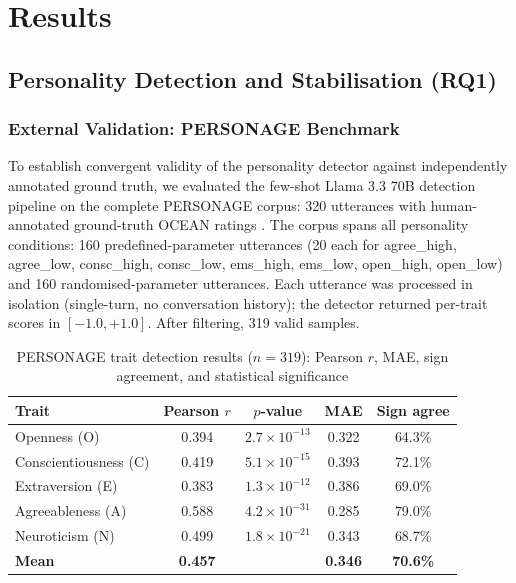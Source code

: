 \documentclass[10pt,a4paper]{report}
\begin{document}
\chapter{Results}
\label{ch:results}

\section{Personality Detection and Stabilisation (RQ1)}

\subsection{External Validation: PERSONAGE Benchmark}

To establish convergent validity of the personality detector against independently annotated ground truth, we evaluated the few-shot Llama 3.3 70B detection pipeline on the complete PERSONAGE corpus: 320 utterances with human-annotated ground-truth OCEAN ratings \citep{Mairesse2011}. The corpus spans all personality conditions: 160 predefined-parameter utterances (20 each for agree\_high, agree\_low, consc\_high, consc\_low, ems\_high, ems\_low, open\_high, open\_low) and 160 randomised-parameter utterances. Each utterance was processed in isolation (single-turn, no conversation history); the detector returned per-trait scores in $[-1.0, +1.0]$. After filtering, 319 valid samples.

\begin{table}[H]
\centering\small
\caption{PERSONAGE trait detection results ($n = 319$): Pearson $r$, MAE, sign agreement, and statistical significance}
\begin{tabular}{@{}lcccc@{}}
\toprule
Trait & Pearson $r$ & $p$-value & MAE & Sign agree \\
\midrule
Openness (O) & 0.394 & $2.7 \times 10^{-13}$ & 0.322 & 64.3\% \\
Conscientiousness (C) & 0.419 & $5.1 \times 10^{-15}$ & 0.393 & 72.1\% \\
Extraversion (E) & 0.383 & $1.3 \times 10^{-12}$ & 0.386 & 69.0\% \\
Agreeableness (A) & 0.588 & $4.2 \times 10^{-31}$ & 0.285 & 79.0\% \\
Neuroticism (N) & 0.499 & $1.8 \times 10^{-21}$ & 0.343 & 68.7\% \\
\textbf{Mean} & \textbf{0.457} & & \textbf{0.346} & \textbf{70.6\%} \\
\bottomrule
\end{tabular}
\end{table}
\end{document}

